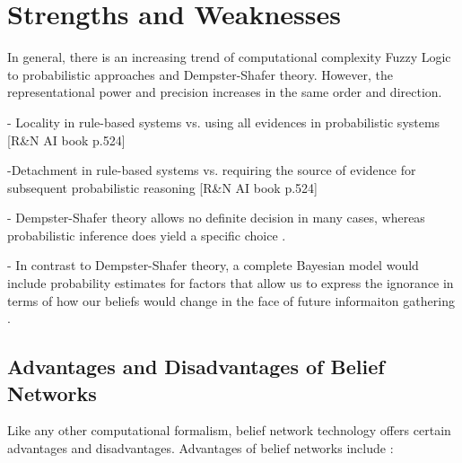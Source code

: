 \documentclass[11pt]{article}
\begin{document}
\section{Strengths and Weaknesses}

In general, there is an increasing trend of computational complexity Fuzzy Logic
to probabilistic approaches and Dempster-Shafer theory. However, the
representational power and precision increases in the same order and direction.

- Locality in rule-based systems vs. using all evidences in probabilistic
systems [R\&N AI book p.524]

-Detachment in rule-based systems vs. requiring the source of evidence for
subsequent probabilistic reasoning [R\&N AI book p.524]

- Dempster-Shafer theory allows no definite decision in many cases, whereas
probabilistic inference does yield a specific choice \cite{russell:ai-modern}.

- In contrast to Dempster-Shafer theory, a complete Bayesian model would include
probability estimates for factors that allow us to express the ignorance in
terms of how our beliefs would change in the face of future informaiton
gathering \cite{russell:ai-modern}.

\subsection{Advantages and Disadvantages of Belief Networks}

Like any other computational formalism, belief network technology offers certain
advantages and disadvantages. Advantages of belief networks include
\cite{das:decision-making-agents}:
\end{document}
